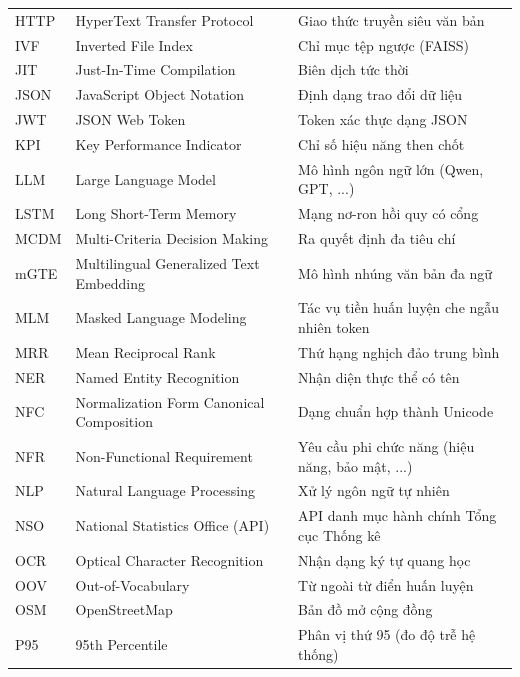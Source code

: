 \begin{longtable}{p{2.4cm} p{5.4cm} p{6.6cm}}
HTTP        & HyperText Transfer Protocol            & Giao thức truyền siêu văn bản \\
IVF         & Inverted File Index                    & Chỉ mục tệp ngược (FAISS) \\
JIT         & Just-In-Time Compilation               & Biên dịch tức thời \\
JSON        & JavaScript Object Notation             & Định dạng trao đổi dữ liệu \\
JWT         & JSON Web Token                         & Token xác thực dạng JSON \\
KPI         & Key Performance Indicator              & Chỉ số hiệu năng then chốt \\
LLM         & Large Language Model                   & Mô hình ngôn ngữ lớn (Qwen, GPT, ...) \\
LSTM        & Long Short-Term Memory                 & Mạng nơ-ron hồi quy có cổng \\
MCDM        & Multi-Criteria Decision Making         & Ra quyết định đa tiêu chí \\
mGTE        & Multilingual Generalized Text Embedding & Mô hình nhúng văn bản đa ngữ \\
MLM         & Masked Language Modeling               & Tác vụ tiền huấn luyện che ngẫu nhiên token \\
MRR         & Mean Reciprocal Rank                   & Thứ hạng nghịch đảo trung bình \\
NER         & Named Entity Recognition               & Nhận diện thực thể có tên \\
NFC         & Normalization Form Canonical Composition & Dạng chuẩn hợp thành Unicode \\
NFR         & Non-Functional Requirement             & Yêu cầu phi chức năng (hiệu năng, bảo mật, ...) \\
NLP         & Natural Language Processing            & Xử lý ngôn ngữ tự nhiên \\
NSO         & National Statistics Office (API)       & API danh mục hành chính Tổng cục Thống kê \\
OCR         & Optical Character Recognition          & Nhận dạng ký tự quang học \\
OOV         & Out-of-Vocabulary                      & Từ ngoài từ điển huấn luyện \\
OSM         & OpenStreetMap                          & Bản đồ mở cộng đồng \\
P95         & 95th Percentile                        & Phân vị thứ 95 (đo độ trễ hệ thống) \\

\end{longtable}
